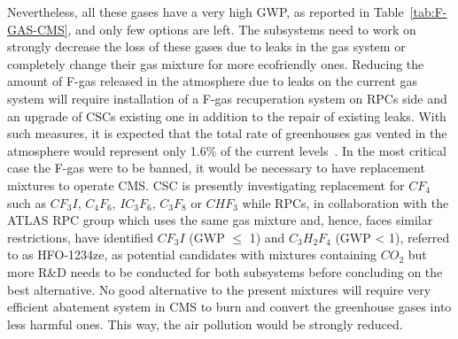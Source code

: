 	Nevertheless, all these gases have a very high GWP, as reported in Table~\ref{tab:F-GAS-CMS}, and only few options are left. The subsystems need to work on strongly decrease the loss of these gases due to leaks in the gas system or completely change their gas mixture for more ecofriendly ones. Reducing the amount of F-gas released in the atmosphere due to leaks on the current gas system will require installation of a F-gas recuperation system on RPCs side and an upgrade of CSCs existing one in addition to the repair of existing leaks. With such measures, it is expected that the total rate of greenhouses gas vented in the atmosphere would represent only 1.6\% of the current levels~\cite{PHASEIITP}. In the most critical case the F-gas were to be banned, it would be necessary to have replacement mixtures to operate CMS. CSC is presently investigating replacement for $CF_4$ such as $CF_3I$, $C_4F_6$, $IC_3F_6$, $C_3F_8$ or $CHF_3$ while RPCs, in collaboration with the ATLAS RPC group which uses the same gas mixture and, hence, faces similar restrictions, have identified $CF_3I$ (GWP $\leq$ 1) and $C_3H_2F_4$ (GWP < 1), referred to as HFO-1234ze, as potential candidates with mixtures containing $CO_2$ but more R\&D needs to be conducted for both subsystems before concluding on the best alternative. No good alternative to the present mixtures will require very efficient abatement system in CMS to burn and convert the greenhouse gases into less harmful ones. This way, the air pollution would be strongly reduced.
	
